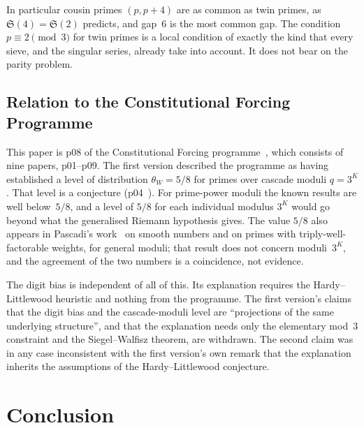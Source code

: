 \documentclass[12pt,a4paper]{article}
\theoremstyle{plain}
\theoremstyle{definition}
\theoremstyle{remark}
\begin{document}
In particular cousin primes $(p, p+4)$ are as common as twin primes, as
$\mathfrak{S}(4) = \mathfrak{S}(2)$ predicts, and gap~6 is the most common gap. The
condition $p \equiv 2 \pmod 3$ for twin primes is a local condition of exactly the kind
that every sieve, and the singular series, already take into account. It does not bear on
the parity problem.

\subsection{Relation to the Constitutional Forcing Programme}
\label{sec:relation}

This paper is p08 of the Constitutional Forcing programme~\cite{Wakil26}, which
consists of nine papers, p01--p09. The first version described the programme as having
established a level of distribution $\theta_W = 5/8$ for primes over cascade moduli
$q = 3^K$. That level is a conjecture (p04~\cite{Wakil26d}). For prime-power moduli the
known results are well below~$5/8$, and a level of $5/8$ for each individual modulus
$3^K$ would go beyond what the generalised Riemann hypothesis gives. The value $5/8$ also appears in Pascadi's
work~\cite{Pas25} on smooth numbers and on primes with triply-well-factorable weights,
for general moduli; that result does not concern moduli~$3^K$, and the agreement of the
two numbers is a coincidence, not evidence.

The digit bias is independent of all of this. Its explanation requires the
Hardy--Littlewood heuristic and nothing from the programme. The first version's claims
that the digit bias and the cascade-moduli level are ``projections of the same
underlying structure'', and that the explanation needs only the elementary mod~3
constraint and the Siegel--Walfi{}sz theorem, are withdrawn. The second claim was in any
case inconsistent with the first version's own remark that the explanation inherits the
assumptions of the Hardy--Littlewood conjecture.

\section{Conclusion}
\label{sec:conclusion}
\end{document}
